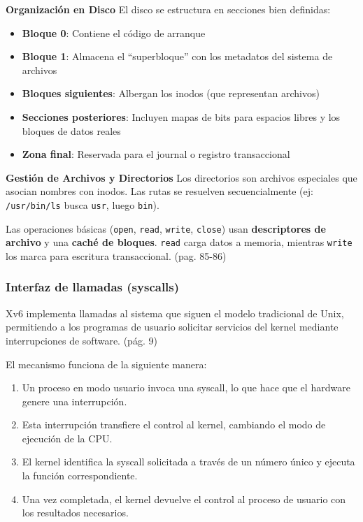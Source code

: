 \begin{itemize}
\textbf{Organización en Disco}
El disco se estructura en secciones bien definidas:

\begin{itemize}
    \item \textbf{Bloque 0}: Contiene el código de arranque
    \item \textbf{Bloque 1}: Almacena el ``superbloque'' con los metadatos del sistema de archivos
    \item \textbf{Bloques siguientes}: Albergan los inodos (que representan archivos)
    \item \textbf{Secciones posteriores}: Incluyen mapas de bits para espacios libres y los bloques de datos reales
    \item \textbf{Zona final}: Reservada para el journal o registro transaccional
\end{itemize}

\textbf{Gestión de Archivos y Directorios}
Los directorios son archivos especiales que asocian nombres con inodos. Las rutas se resuelven secuencialmente (ej: \texttt{/usr/bin/ls} busca \texttt{usr}, luego \texttt{bin}).

Las operaciones básicas (\texttt{open}, \texttt{read}, \texttt{write}, \texttt{close}) usan \textbf{descriptores de archivo} y una \textbf{caché de bloques}. \texttt{read} carga datos a memoria, mientras \texttt{write} los marca para escritura transaccional.
\citep{xv6_mit}(pag. 85-86)

\subsubsection*{Interfaz de llamadas (syscalls)}
Xv6 implementa llamadas al sistema que siguen el modelo tradicional de Unix, permitiendo a los programas de usuario solicitar servicios del kernel mediante interrupciones de software.\citep{xv6_mit} (pág. 9)

El mecanismo funciona de la siguiente manera:
\begin{enumerate}
    \item Un proceso en modo usuario invoca una syscall, lo que hace que el hardware genere una interrupción.
    \item Esta interrupción transfiere el control al kernel, cambiando el modo de ejecución de la CPU.
    \item El kernel identifica la syscall solicitada a través de un número único y ejecuta la función correspondiente.
    \item Una vez completada, el kernel devuelve el control al proceso de usuario con los resultados necesarios.
\end{enumerate}


\end{itemize}
